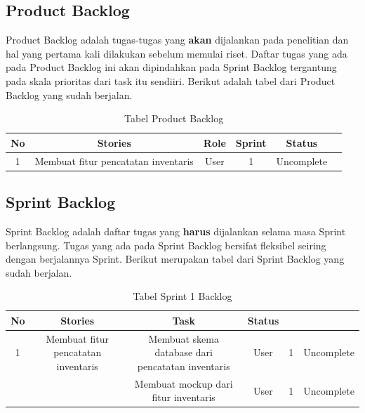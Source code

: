 \subsection{Product Backlog}

Product Backlog adalah tugas-tugas yang \textbf{akan} dijalankan pada penelitian dan hal yang pertama kali dilakukan sebelum memulai riset. Daftar tugas yang ada pada Product Backlog ini akan dipindahkan pada Sprint Backlog tergantung pada skala prioritas dari task itu sendiiri. Berikut adalah tabel dari Product Backlog yang sudah berjalan.

\begin{table}[H]	
	\begin{center}
		\caption{Tabel Product Backlog}
		\label{tab:table5}
		\begin{tabular}{|c|c|c|c|c|c|}
		\hline
		\textbf{No} & \textbf{Stories} & \textbf{Role} & \textbf{Sprint} & \textbf{Status} \\
		\hline
		1 & Membuat fitur pencatatan inventaris & User & 1 & Uncomplete \\
		\hline
		\end{tabular}
	\end{center}
\end{table}

\subsection{Sprint Backlog}

Sprint Backlog adalah daftar tugas yang \textbf{harus} dijalankan selama masa Sprint berlangsung. Tugas yang ada pada Sprint Backlog bersifat fleksibel seiring dengan berjalannya Sprint. Berikut merupakan tabel dari Sprint Backlog yang sudah berjalan.

\begin{table}[H]	
	\begin{center}
		\caption{Tabel Sprint 1 Backlog}
		\label{tab:table6}
		\begin{tabular}{|c|c|c|c|c|c|}
		\hline
		\textbf{No} & \textbf{Stories} & \textbf{Task} & \textbf{Status} \\
		\hline
		1 & Membuat fitur pencatatan inventaris & Membuat skema database dari pencatatan inventaris & User & 1 & Uncomplete \\
		 &  & Membuat mockup dari fitur inventaris & User & 1 & Uncomplete \\
		\hline
		\end{tabular}
	\end{center}
\end{table}

